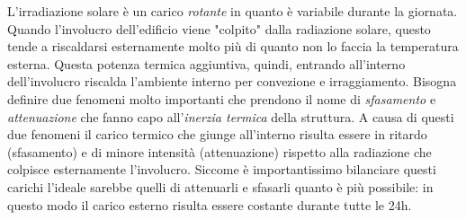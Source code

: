 L'irradiazione solare è un carico \emph{rotante} in quanto è variabile durante la giornata. Quando l'involucro dell'edificio viene "colpito" dalla radiazione solare, questo tende a riscaldarsi esternamente molto più di quanto non lo faccia la temperatura esterna. Questa potenza termica aggiuntiva, quindi, entrando all'interno dell'involucro riscalda l'ambiente interno per convezione e irraggiamento. Bisogna definire due fenomeni molto importanti che prendono il nome di \emph{sfasamento} e \emph{attenuazione} che fanno capo all'\emph{inerzia termica} della struttura. A causa di questi due fenomeni il carico termico che giunge all'interno risulta essere in ritardo (sfasamento) e di minore intensità (attenuazione) rispetto alla radiazione che colpisce esternamente l'involucro. Siccome è importantissimo bilanciare questi carichi l'ideale sarebbe quelli di attenuarli e sfasarli quanto è più possibile: in questo modo il carico esterno risulta essere costante durante tutte le 24h. 

